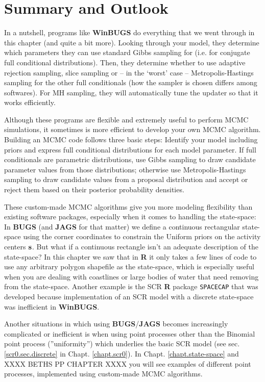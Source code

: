 \section{Summary and Outlook}

In a nutshell, programs like {\bf WinBUGS} do everything that we 
went through in this chapter (and quite a bit more). Looking through 
your model, they determine which parameters they can use standard 
Gibbs sampling for (i.e. for conjugate full conditional distributions). 
Then, they determine whether to use adaptive 
rejection sampling, slice sampling or -- in the `worst' case -- 
Metropolis-Hastings sampling for the other full conditionals (how the sampler is chosen differs among softwares). For MH sampling, they will 
automatically tune the updater so that it works efficiently.

Although these programs are flexible and extremely useful to perform MCMC simulations, it sometimes is more efficient to 
develop your own MCMC algorithm. Building an MCMC code follows three basic 
steps: Identify your model including priors and express full conditional 
distributions for each model parameter. If full conditionals are parametric 
distributions, use Gibbs sampling to draw candidate parameter values from 
those distributions; otherwise use Metropolis-Hastings sampling to draw 
candidate values from a proposal distribution and accept or reject them 
based on their posterior probability densities.

These custom-made MCMC algorithms give you more modeling flexibility than 
existing software packages, especially when it comes to handling the
 state-space: In {\bf BUGS} (and {\bf JAGS} for that matter) we define
  a continuous rectangular state-space using the corner coordinates to 
  constrain the Uniform priors on the activity centers ${\bf s}$.
   But what if a continuous rectangle isn't an adequate description of 
   the state-space? In this chapter we saw that in {\bf R} it only takes 
   a few lines of code to use any arbitrary polygon shapefile as the 
   state-space, which is especially useful when you are dealing with 
   coastlines or large bodies of water that need removing from the 
   state-space. Another example is the SCR {\bf R} package \mbox{\tt SPACECAP}
    \citep{gopalaswamy_etal:2011} that was developed because implementation
     of an SCR model with a discrete state-space was inefficient in {\bf WinBUGS}.
     
Another situations in which using {\bf BUGS}/{\bf JAGS} becomes
increasingly
complicated or inefficient is when using point processes other 
than the 
 Binomial point process (''uniformity'') which underlies the basic 
 SCR model (see sec. \ref{scr0.sec.discrete} in Chapt. \ref {chapt.scr0}). In Chapt. 
 \ref {chapt.state-space} and XXXX BETHS PP CHAPTER XXXX you will see examples of different point processes,
  implemented using custom-made MCMC algorithms.

